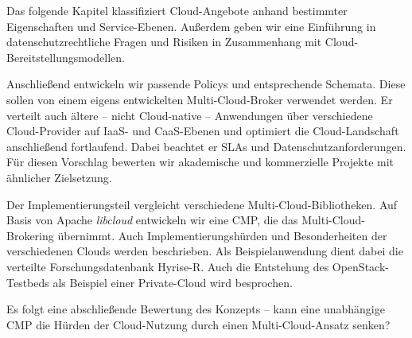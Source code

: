 Das folgende Kapitel klassifiziert Cloud-Angebote anhand bestimmter Eigenschaften und Service-Ebenen. Außerdem geben wir eine Einführung in datenschutzrechtliche Fragen und Risiken in Zusammenhang mit Cloud-Bereit\-stel\-lungs\-model\-len.

Anschließend entwickeln wir passende Policys und entsprechende Schemata. Diese sollen von einem eigens entwickelten Multi-Cloud-Broker verwendet werden. Er verteilt auch ältere -- nicht Cloud-native -- Anwendungen über verschiedene Cloud-Provider auf IaaS- und CaaS-Ebenen und optimiert die Cloud-Landschaft anschließend fortlaufend. Dabei beachtet er SLAs und Datenschutzanforderungen. Für diesen Vorschlag bewerten wir akademische und kommerzielle Projekte mit ähnlicher Zielsetzung.

Der Implementierungsteil vergleicht verschiedene Multi-Cloud-Bibliotheken. Auf Basis von Apache \emph{libcloud} entwickeln wir eine CMP, die das Multi-Cloud-Brokering übernimmt. Auch Implementierungshürden und Besonderheiten der verschiedenen Clouds werden beschrieben. Als Beispielanwendung dient dabei die verteilte Forschungsdatenbank Hyrise-R. Auch die Entstehung des OpenStack-Testbeds als Beispiel einer Private-Cloud wird besprochen.

Es folgt eine abschließende Bewertung des Konzepts -- kann eine unabhängige CMP die Hürden der Cloud-Nutzung durch einen Multi-Cloud-Ansatz senken?


%
